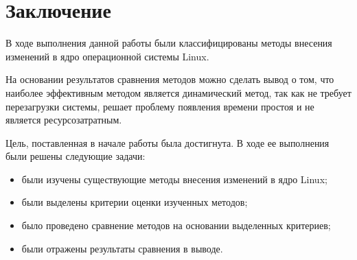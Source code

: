 \chapter*{Заключение}

В ходе выполнения данной работы были классифицированы методы внесения изменений в ядро операционной системы Linux. 

На основании результатов сравнения методов можно сделать вывод о том, что наиболее эффективным методом является динамический метод, так как не требует перезагрузки системы, решает проблему появления времени простоя и не является ресурсозатратным.

Цель, поставленная в начале работы была достигнута. В ходе ее выполнения были решены следующие задачи:

\begin{itemize}
	\item были изучены существующие методы внесения изменений в ядро Linux;
	\item были выделены критерии оценки изученных методов;
	\item было проведено сравнение методов на основании выделенных критериев;
	\item были отражены результаты сравнения в выводе.
\end{itemize}
